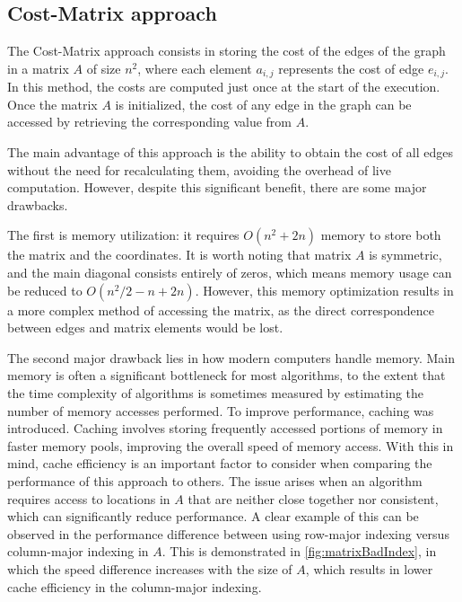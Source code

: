 \subsection{Cost-Matrix approach}

The Cost-Matrix approach consists in storing the cost of the edges of the graph in a matrix $A$ of size $n^2$, where each element $a_{i,j}$ represents the cost of edge $e_{i,j}$.
In this method, the costs are computed just once at the start of the execution.
Once the matrix $A$ is initialized, the cost of any edge in the graph can be accessed by retrieving the corresponding value from $A$.

The main advantage of this approach is the ability to obtain the cost of all edges without the need for recalculating them, avoiding the overhead of live computation.
However, despite this significant benefit, there are some major drawbacks.

The first is memory utilization: it requires $O(n^2 + 2n)$ memory to store both the matrix and the coordinates.
It is worth noting that matrix $A$ is symmetric, and the main diagonal consists entirely of zeros, which means memory usage can be reduced to $O(n^2/2-n+2n)$.
However, this memory optimization results in a more complex method of accessing the matrix, as the direct correspondence between edges and matrix elements would be lost.

The second major drawback lies in how modern computers handle memory.
Main memory is often a significant bottleneck for most algorithms, to the extent that the time complexity of algorithms is sometimes measured by estimating the number of memory accesses performed.
To improve performance, caching was introduced.
Caching involves storing frequently accessed portions of memory in faster memory pools, improving the overall speed of memory access.
With this in mind, cache efficiency is an important factor to consider when comparing the performance of this approach to others.
The issue arises when an algorithm requires access to locations in $A$ that are neither close together nor consistent, which can significantly reduce performance.
A clear example of this can be observed in the performance difference between using row-major indexing versus column-major indexing in $A$.
This is demonstrated in \figurename{ \ref{fig:matrixBadIndex}}, in which the speed difference increases with the size of $A$, which results in lower cache efficiency in the column-major indexing.


